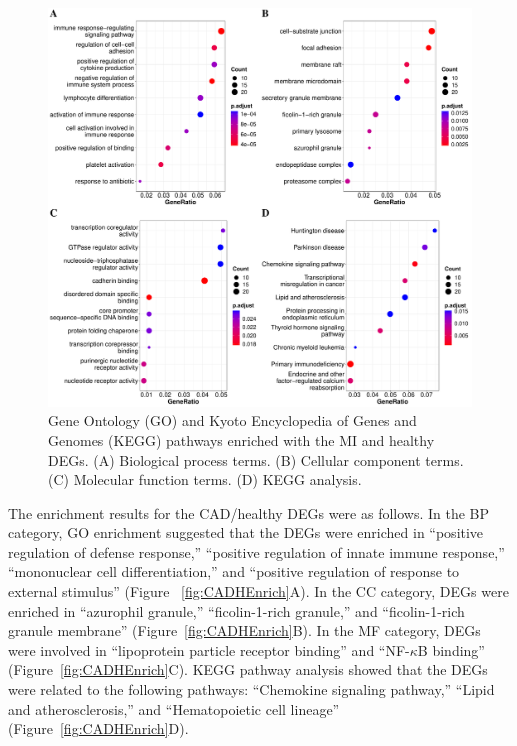 \documentclass[sn-mathphys,Numbered]{sn-jnl}%
\theoremstyle{thmstyleone}%
\theoremstyle{thmstyletwo}%
\theoremstyle{thmstylethree}%
\begin{document}
\begin{figure}
\centering
\includegraphics[width=0.95\linewidth]{Enrichment MI-Healthy} \caption{Gene Ontology (GO) and Kyoto Encyclopedia of Genes and Genomes (KEGG) pathways enriched with the MI and healthy DEGs. (A) Biological process terms. (B) Cellular component terms. (C) Molecular function terms. (D) KEGG analysis.}
\label{fig:MIHEnrich}
\end{figure}

The enrichment results for the CAD/healthy DEGs were as follows. In the
BP category, GO enrichment suggested that the DEGs were enriched in
``positive regulation of defense response,'' ``positive regulation of
innate immune response,'' ``mononuclear cell differentiation,'' and
``positive regulation of response to external stimulus'' (Figure
~\ref{fig:CADHEnrich}A). In the CC category, DEGs were enriched in
``azurophil granule,'' ``ficolin-1-rich granule,'' and ``ficolin-1-rich
granule membrane'' (Figure~\ref{fig:CADHEnrich}B). In the MF category,
DEGs were involved in ``lipoprotein particle receptor binding'' and
``NF-$\kappa$B binding'' (Figure~\ref{fig:CADHEnrich}C). KEGG pathway
analysis showed that the DEGs were related to the following pathways:
``Chemokine signaling pathway,'' ``Lipid and atherosclerosis,'' and
``Hematopoietic cell lineage'' (Figure~\ref{fig:CADHEnrich}D).
\end{document}

